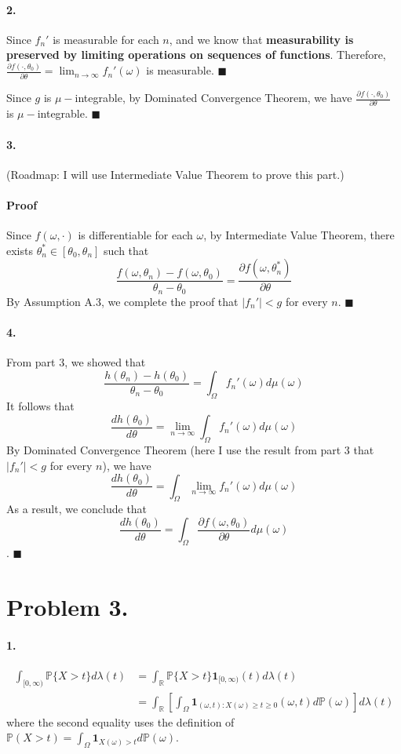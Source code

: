 \documentclass[11pt]{article}
\theoremstyle{definition}
\theoremstyle{boldtitle} %
\numberwithin{equation}{section}
\numberwithin{figure}{section}
\numberwithin{table}{section}
\begin{document}
\paragraph{2.} Since $f_n'$ is measurable for each $n$, and we know that \textbf{measurability is preserved by limiting operations on sequences of functions}.
Therefore, $\frac{\partial f(\cdot, \theta_0)}{\partial \theta} = \lim_{n \to \infty} f_n'(\omega)$ is measurable. \(\blacksquare\)

Since $g$ is $\mu-$integrable, by Dominated Convergence Theorem, we have 
$\frac{\partial f(\cdot, \theta_0)}{\partial \theta}$ is $\mu-$integrable. \(\blacksquare\)

\paragraph{3.} 
(Roadmap: I will use Intermediate Value Theorem to prove this part.)
\paragraph{Proof} Since $f(\omega, \cdot)$ is differentiable for each $\omega$,
by Intermediate Value Theorem, there exists $\theta_n^* \in [\theta_0, \theta_n]$ such that
\[
\frac{f(\omega, \theta_n) - f(\omega, \theta_0 )}{\theta_n - \theta_0} 
= \frac{\partial f(\omega, \theta_n^*)}{\partial \theta}
\]
By Assumption A.3, we complete the proof that $|f_n'| < g$ for every $n$. \(\blacksquare\)


\paragraph{4.}
From part 3, we showed that 
\[
\frac{h(\theta_n) - h(\theta_0)}{\theta_n - \theta_0} = \int_\Omega f_n'(\omega) d \mu (\omega)
\]
It follows that
\[
\frac{dh(\theta_0)}{d \theta} = \lim_{n \rightarrow \infty} \int_\Omega f_n'(\omega) d \mu (\omega)
\]
By Dominated Convergence Theorem (here I use the result from part 3 that $|f_n'| < g$ for every $n$), we have 
\[
\frac{dh(\theta_0)}{d \theta} = \int_\Omega \lim_{n \rightarrow \infty} f_n'(\omega) d \mu (\omega)
\]
As a result, we conclude that
\[
\frac{dh(\theta_0)}{d \theta} = \int_\Omega \frac{\partial f(\omega, \theta_0)}{\partial \theta} d \mu (\omega)
\]. \(\blacksquare\)


\section*{Problem 3.}
\paragraph{1.} 
\begin{align*}
    \int_{[0,\infty)}\mathbb{P}\{ X > t \} d \lambda(t) & = \int_{\mathbb{R}} \mathbb{P}\{ X > t \} \bm{1}_{[0,\infty)}(t) d \lambda(t) \\ 
    & = \int_{\mathbb{R}} \left[ \int_\Omega \bm{1}_{(\omega, t): X(\omega) \geq t \geq 0}(\omega, t) d \mathbb{P}(\omega) \right] d \lambda(t)
\end{align*}
where the second equality uses the definition of $\mathbb{P}(X > t) = \int_\Omega \bm{1}_{{X(\omega) > t}} d\mathbb{P}(\omega)$.
\end{document}

